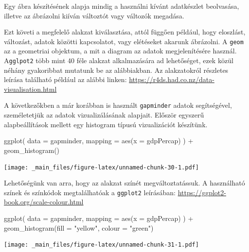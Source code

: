 \documentclass[
]{book}
\newenvironment{Shaded}{\begin{snugshade}}{\end{snugshade}}
\newcommand{\AttributeTok}[1]{\textcolor[rgb]{0.77,0.63,0.00}{#1}}
\newcommand{\FunctionTok}[1]{\textcolor[rgb]{0.00,0.00,0.00}{#1}}
\newcommand{\NormalTok}[1]{#1}
\newcommand{\SpecialCharTok}[1]{\textcolor[rgb]{0.00,0.00,0.00}{#1}}
\newcommand{\StringTok}[1]{\textcolor[rgb]{0.31,0.60,0.02}{#1}}
\begin{document}
Egy ábra készítésének alapja mindig a használni kívánt adatkészlet
beolvasása, illetve az ábrázolni kiíván változtót vagy változók
megadása.

Ezt követi a megfelelő alakzat kiválasztása, attól függően például, hogy
eloszlást, változást, adatok közötti kapcsolatot, vagy elétéseket
akarunk ábrázolni. A \texttt{geom} az a geometriai objektum, a mit a
diagram az adatok megjelenítésére használ. A\texttt{gglpot2} több mint
40 féle alakzat alkalmazására ad lehetőséget, ezek közül néhány
gyakoribbat mutatunk be az alábbiakban. Az alakzatokról részletes
leírása található például az alábbi linken:
\url{https://r4ds.had.co.nz/data-visualisation.html}

A következőkben a már korábban is használt \texttt{gapminder} adatok
segítségével, személetetjük az adatok vizualizálásának alapjait. Először
egyszerű alapbeállítások mellett egy histogram típusú vizualizációt
készítünk.

\begin{Shaded}
\begin{Highlighting}[]
\FunctionTok{ggplot}\NormalTok{(}
  \AttributeTok{data =}\NormalTok{ gapminder, }
  \AttributeTok{mapping =} \FunctionTok{aes}\NormalTok{(}\AttributeTok{x =}\NormalTok{ gdpPercap)}
\NormalTok{) }\SpecialCharTok{+} 
  \FunctionTok{geom\_histogram}\NormalTok{() }
\end{Highlighting}
\end{Shaded}

\texttt{[image: \_main\_files/figure-latex/unnamed-chunk-30-1.pdf]}

Lehetőségünk van arra, hogy az alakzat színét megváltoztatássuk. A
használható színek és színkódok megtalálhatóak a \texttt{ggplot2}
leírásában: \url{https://ggplot2-book.org/scale-colour.html}

\begin{Shaded}
\begin{Highlighting}[]
\FunctionTok{ggplot}\NormalTok{(}
  \AttributeTok{data =}\NormalTok{ gapminder,}
  \AttributeTok{mapping =} \FunctionTok{aes}\NormalTok{(}\AttributeTok{x =}\NormalTok{ gdpPercap)}
\NormalTok{) }\SpecialCharTok{+}
  \FunctionTok{geom\_histogram}\NormalTok{(}\AttributeTok{fill =} \StringTok{"yellow"}\NormalTok{, }\AttributeTok{colour =} \StringTok{"green"}\NormalTok{) }
\end{Highlighting}
\end{Shaded}

\texttt{[image: \_main\_files/figure-latex/unnamed-chunk-31-1.pdf]}
\end{document}
